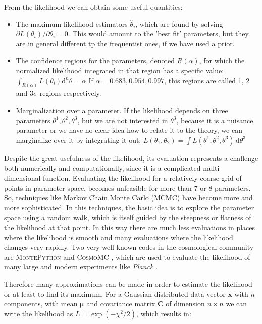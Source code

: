 From the likelihood we can obtain some useful quantities:
\begin{itemize}
	\item The maximum likelihood estimators $\hat{\theta}_{i}$,
	which are found by solving \\ $\partial L(\theta_i)/\partial\theta_i = 0$.
	This would amount to the 'best fit' parameters, but they
	are in general different tp the frequentist ones, if we have used a prior.
	\item The confidence regions for the parameters, denoted $R(\alpha)$, for which
	the normalized likelihood integrated in that region has a specific value:\\ 
	\beeqp$\label{eq:likeli-confidregions}
	\int_{R(\alpha)}  L(\theta_i) \mathrm{d}^n \theta = \alpha$
	If $\alpha=0.683,0.954,0.997$, this regions are called 1, 2 and 3$\sigma$ regions respectively.
	\item Marginalization over a parameter. If the likelihood depends on 
	three parameters $\theta^1, \theta^2, \theta^3$, but we are not interested in $\theta^3$, because it is a nuisance parameter
	or we have no clear idea how to relate it to the theory, we can marginalize over it by integrating 
	it out: $L(\theta_1, \theta_2) = \int L(\theta^1, \theta^2, \theta^3) \,\mathrm{d}\theta^3 $
	
\end{itemize}

Despite the great usefulness of the likelihood, its evaluation represents a challenge both numerically
and computationally, since it is a complicated multi-
dimensional function.
Evaluating the likelihood for a relatively coarse grid of points in parameter space, becomes unfeasible for 
more than 7 or 8 parameters. So, techniques like Markov Chain Monte Carlo (MCMC) \cite{cite some basic MCMC literature}
 have become more and more sophisticated. In this techniques, the basic idea is to explore the parameter
 space using a random walk, which is itself guided by the steepness or flatness of the likelihood at that point.
 In this way there are much less evaluations in places where the likelihood is smooth and many evaluations
 where the likelihood changes very rapidly. Two very well known
 codes in the cosmological community are \textsc{MontePython} and \textsc{CosmoMC} \cite{cite Cosmomc and Montepython},
 which are used to evaluate the likelihood of many large and modern experiments like \textit{Planck} \cite{cite Planck}.
 
Therefore many approximations can be made in order to estimate the likelihood or at least 
to find its maximum. 
For a Gaussian distributed data vector $\bm{x}$ with $n$ components, 
with mean $\bm{\mu}$ and covariance matrix $\bm{C}$ of dimension $n\times n$ we can 
write the likelihood as $L = \exp(-\chi^2/2)$, which results in: 

